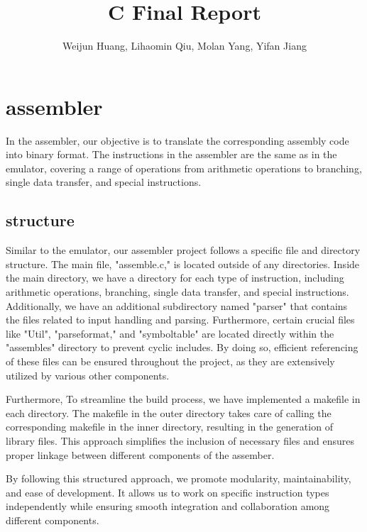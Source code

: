 \documentclass[11pt]{article}
\begin{document}
\title{C Final Report}
\author{Weijun Huang, Lihaomin Qiu, Molan Yang, Yifan Jiang}

\maketitle

\section{assembler}

In the assembler, our objective is to translate the corresponding assembly code into binary format. The instructions in the assembler are the same as in the emulator, covering a range of operations from arithmetic operations to branching, single data transfer, and special instructions.

\subsection{structure}

Similar to the emulator, our assembler project follows a specific file and directory structure.  The main file, "assemble.c," is located outside of any directories. Inside the main directory, we have a directory for each type of instruction, including arithmetic operations, branching, single data transfer, and special instructions. Additionally, we have an additional subdirectory named "parser" that contains the files related to input handling and parsing. Furthermore, certain crucial files like "Util", "parseformat," and "symboltable" are located directly within the "assembles" directory to prevent cyclic includes. By doing so, efficient referencing of these files can be ensured throughout the project, as they are extensively utilized by various other components.

Furthermore, To streamline the build process, we have implemented a makefile in each directory. The makefile in the outer directory takes care of calling the corresponding makefile in the inner directory, resulting in the generation of library files. This approach simplifies the inclusion of necessary files and ensures proper linkage between different components of the assember.

By following this structured approach, we promote modularity, maintainability, and ease of development. It allows us to work on specific instruction types independently while ensuring smooth integration and collaboration among different components.
\end{document}
